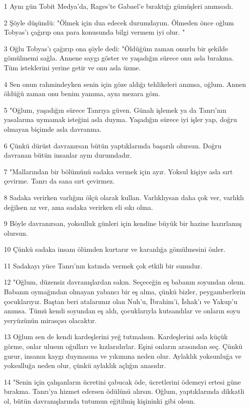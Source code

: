 \par 1 Aynı gün Tobit Medya'da, Rages'te Gabael'e bıraktığı gümüşleri anımsadı.
\par 2 Şöyle düşündü: "Ölmek için dua edecek durumdayım. Ölmeden önce oğlum Tobyas'ı çağırıp ona para konusunda bilgi vermem iyi olur. "
\par 3 Oğlu Tobyas'ı çağırıp ona şöyle dedi: "Öldüğüm zaman onurlu bir şekilde gömülmemi sağla. Annene saygı göster ve yaşadığın sürece onu asla bırakma. Tüm isteklerini yerine getir ve onu asla üzme.
\par 4 Sen onun rahmindeyken senin için göze aldığı tehlikeleri anımsa, oğlum. Annen öldüğü zaman onu benim yanıma, aynı mezara göm.
\par 5 "Oğlum, yaşadığın sürece Tanrıya güven. Günah işlemek ya da Tanrı'nın yasalarına uymamak isteğini asla duyma. Yaşadığın sürece iyi işler yap, doğru olmayan biçimde asla davranma.
\par 6 Çünkü dürüst davranırsan bütün yaptıklarında başarılı olursun. Doğru davranan bütün insanlar aynı durumdadır.
\par 7 "Mallarından bir bölümünü sadaka vermek için ayır. Yoksul kişiye asla sırt çevirme. Tanrı da sana sırt çevirmez.
\par 8 Sadaka verirken varlığını ölçü olarak kullan. Varlıklıysan daha çok ver, varlıklı değilsen az ver, ama sadaka verirken eli sıkı olma.
\par 9 Böyle davranırsan, yoksulluk günleri için kendine büyük bir hazine hazırlamış olursun.
\par 10 Çünkü sadaka insanı ölümden kurtarır ve karanlığa gömülmesini önler.
\par 11 Sadakayı yüce Tanrı'nın katında vermek çok etkili bir sunudur.
\par 12 "Oğlum, düzensiz davranışlardan sakın. Seçeceğin eş babanın soyundan olsun. Babanın oymağından olmayan yabancı bir eş alma, çünkü bizler, peygamberlerin çocuklarıyız. Baştan beri atalarımız olan Nuh'u, İbrahim'i, İshak'ı ve Yakup'u anımsa. Tümü kendi soyundan eş aldı, çocuklarıyla kutsandılar ve onların soyu yeryüzünün mirasçısı olacaktır.
\par 13 Oğlum sen de kendi kardeşlerini yeğ tutmalısın. Kardeşlerini asla küçük görme, onlar ulusun oğulları ve kızlarıdırlar. Eşini onların arasından seç. Çünkü gurur, insanın kaygı duymasına ve yıkımına neden olur. Aylaklık yoksunluğa ve yoksulluğa neden olur, çünkü aylaklık açlığın anasıdır.
\par 14 "Senin için çalışanların ücretini çabucak öde, ücretlerini ödemeyi ertesi güne bırakma. Tanrı'ya hizmet edersen ödülünü alırsın. Oğlum, yaptıklarında dikkatli ol, bütün davranışlarında tutumun eğitilmiş kişininki gibi olsun.
